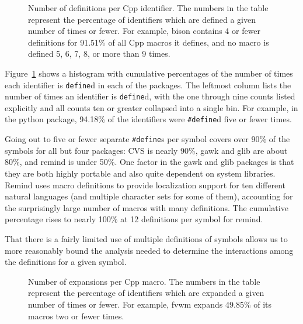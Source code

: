\documentclass[11pt]{article}
\begin{document}

\begin{figure}
{\small
  \setlength{\tabcolsep}{.25em}
  \centerline{}%
}
\caption{Number of definitions per Cpp identifier.  The numbers in the
  table represent the percentage of identifiers which are defined a given
  number of times or fewer.  For example, bison contains 4 or fewer
  definitions for 91.51\% of all Cpp macros it defines, and no
  macro is defined 5, 6, 7, 8, or more than 9 times.}
\label{fig:define_count}
\end{figure}

Figure~\ref{fig:define_count} shows a histogram with cumulative
percentages of the number of times each identifier is {\tt define}d
in each of the packages.  The leftmost column lists the number of
times an identifier is {\tt define}d, with the one through nine counts
listed explicitly and all counts ten or greater collapsed into a
single bin.  
For example, in the python package, 94.18\% of
the identifiers were {\tt \#define}d five or fewer times.  

Going out to five or fewer separate {\tt \#define}s per symbol covers
over 90\% of the symbols for all but four packages: CVS is nearly
90\%, gawk and glib are about 80\%, and remind is under 50\%.  One
factor in the gawk and glib packages is that they are both highly
portable and also quite dependent on system libraries.  Remind uses macro
definitions to provide localization support for ten different natural
languages (and multiple character sets for some of them), accounting for
the surprisingly large number of macros with many definitions.  The
cumulative percentage rises to nearly 100\% at 12 definitions per symbol
for remind.

That there is a fairly limited use of multiple definitions of symbols
allows us to more reasonably bound the analysis needed to determine
the interactions among the definitions for a given symbol.

\begin{figure}
{\small
  \setlength{\tabcolsep}{.25em}
  \centerline{}%
}
\caption{Number of expansions per Cpp macro.  The numbers in the
  table represent the percentage of identifiers which are expanded a given
  number of times or fewer.  For example, fvwm expands 49.85\% of its
  macros two or fewer times.}
\label{fig:use_count}
\end{figure}
\end{document}
